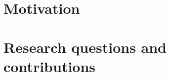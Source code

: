 \documentclass[dissertation,math,vertlayout,pdfa,colorlinks]{aaltoseries}
\begin{document}




\section{Motivation}






 
\section{Research questions and contributions}
\end{document}
